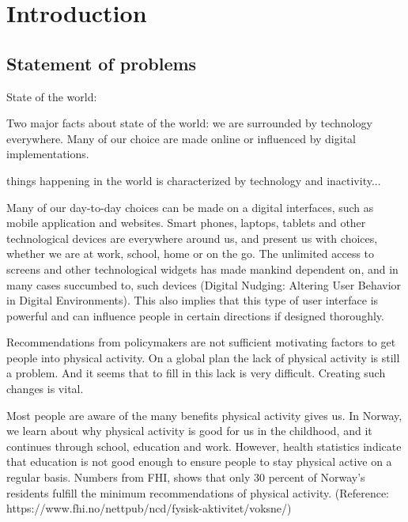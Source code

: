 \chapter{Introduction} 


\section{Statement of problems}
State of the world: 

Two major facts about state of the world: we are surrounded by technology everywhere. Many of our choice are made online or influenced by digital implementations. 

things happening in the world is characterized by technology and inactivity... 

Many of our day-to-day choices can be made on a digital interfaces, such as mobile application and websites. Smart phones, laptops, tablets and other technological devices are everywhere around us, and present us with choices, whether we are at work, school, home or on the go. The unlimited access to screens and other technological widgets has made mankind dependent on, and in many cases succumbed to, such devices (Digital Nudging: Altering User Behavior in Digital Environments). This also implies that this type of user interface is powerful and can influence people in certain directions if designed thoroughly.  



Recommendations from policymakers are not sufficient motivating factors to get people into physical activity. On a global plan the lack of physical activity is still a problem. And it seems that to fill in this lack is very difficult. Creating such changes is vital. 

Most people are aware of the many benefits physical activity gives us. In Norway, we learn about why physical activity is good for us in the childhood, and it continues through school, education and work. However, health statistics indicate that education is not good enough to ensure people to stay physical active on a regular basis. Numbers from FHI, shows that only 30 percent of Norway's residents fulfill the minimum recommendations of physical activity. (Reference: https://www.fhi.no/nettpub/ncd/fysisk-aktivitet/voksne/) 

